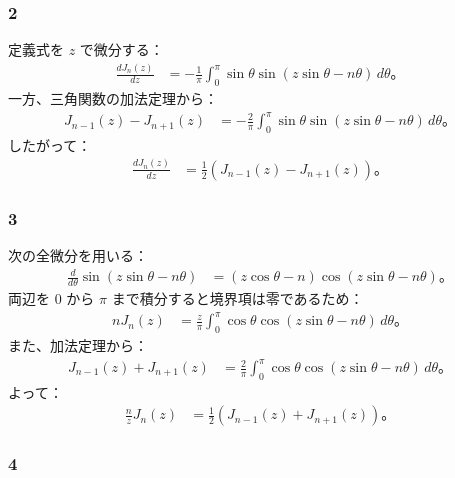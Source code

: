 \documentclass[platex,dvipdfmx,a4paper]{jsarticle}
\newcommand{\bbn}[2]{\frac{d #1}{d #2}}
\begin{document}
\subsubsection*{2}

定義式を $z$ で微分する：
\begin{align*}
  \bbn{J_n(z)}{z}
  &=-\frac{1}{\pi}\int_0^\pi\sin\theta\sin(z\sin\theta-n\theta)\,d\theta。
\end{align*}
一方、三角関数の加法定理から：
\begin{align*}
  J_{n-1}(z)-J_{n+1}(z)
  &=-\frac{2}{\pi}\int_0^\pi\sin\theta\sin(z\sin\theta-n\theta)\,d\theta。
\end{align*}
したがって：
\begin{align*}
  \bbn{J_n(z)}{z}
  &=\frac{1}{2}\left(J_{n-1}(z)-J_{n+1}(z)\right)。
\end{align*}

\subsubsection*{3}

次の全微分を用いる：
\begin{align*}
  \bbn{}{\theta}\sin(z\sin\theta-n\theta)
  &=(z\cos\theta-n)\cos(z\sin\theta-n\theta)。
\end{align*}
両辺を $0$ から $\pi$ まで積分すると境界項は零であるため：
\begin{align*}
  nJ_n(z)
  &=\frac{z}{\pi}\int_0^\pi\cos\theta\cos(z\sin\theta-n\theta)\,d\theta。
\end{align*}
また、加法定理から：
\begin{align*}
  J_{n-1}(z)+J_{n+1}(z)
  &=\frac{2}{\pi}\int_0^\pi\cos\theta\cos(z\sin\theta-n\theta)\,d\theta。
\end{align*}
よって：
\begin{align*}
  \frac{n}{z}J_n(z)
  &=\frac{1}{2}\left(J_{n-1}(z)+J_{n+1}(z)\right)。
\end{align*}

\subsubsection*{4}
\end{document}
